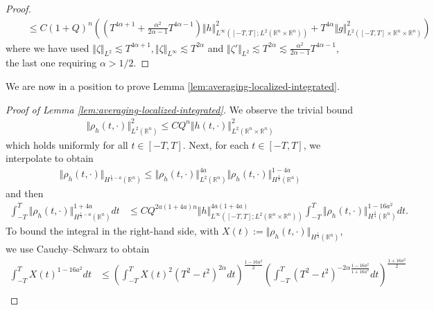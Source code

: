 \documentclass[11pt]{amsart}
\theoremstyle{definition}
\theoremstyle{remark}
\numberwithin{equation}{section}
\newcommand{\nrm}[1]{\Vert#1\Vert}
\newcommand{\0}{\emptyset}
\newcommand{\alp}{\alpha}
\newcommand{\zt}{\zeta}
\newcommand{\bbR}{\mathbb R}
\begin{document}
{\begin{proof}
\begin{equation*}
\begin{split}
				&\quad \leq C(1+Q)^{n}\left( ( T^{4\alp+1} + \frac{\alp^2}{2\alp-1} T^{4\alp - 1} ) \Vert   h\Vert^2_{L^\infty([-T, T]; L^{2}(\mathbb{R}^n\times\mathbb{R}^n))} + T^{4\alp} \Vert  g \Vert^2_{L^2([-T, T]\times\mathbb{R}^n\times\mathbb{R}^n)} \right) 
			\end{split}
		\end{equation*} where we have used $\nrm{\zt}_{L^2} \lesssim T^{4\alp+1}, \nrm{\zt}_{L^\infty} \lesssim T^{2\alp}$ and $\nrm{\zt'}_{L^2} \lesssim T^{2\alp} \lesssim \frac{\alp^2}{2\alp-1} T^{4\alp - 1} $, the last one requiring $\alp>1/2$. 
	\end{proof}
	
	We are now in a position to prove Lemma \ref{lem:averaging-localized-integrated}. 
	
	\begin{proof}[Proof of Lemma \ref{lem:averaging-localized-integrated}]
		We observe the trivial bound \begin{equation*}
			\begin{split}
				\nrm{\rho_{h}(t,\cdot)}^2_{L^2(\bbR^n)} \le CQ^{n} \nrm{h(t,\cdot)}_{L^2(\bbR^n\times\bbR^n)}^{2}
			\end{split}
		\end{equation*} which holds uniformly for all $t \in [-T,T]$. Next, for each $t \in [-T,T]$, we interpolate to obtain \begin{equation*}
		\begin{split}
			\nrm{\rho_{h}(t,\cdot)}_{H^{\frac14 - a }(\bbR^n)} \le \nrm{\rho_{h}(t,\cdot)}_{L^2(\bbR^n)}^{4a} \nrm{\rho_{h}(t,\cdot)}^{1-4a}_{H^{\frac14}(\bbR^n)}
		\end{split}
		\end{equation*} and then \begin{equation}\label{eq:inter}
		\begin{split}
			\int_{-T}^{T} \nrm{\rho_{h}(t,\cdot)}^{1+4a}_{H^{\frac14 - a }(\bbR^n)}  dt &\le CQ^{2a(1+4a) n} \nrm{h}_{L^{\infty}([-T,T];L^2(\bbR^n\times\bbR^n))}^{4a(1+4a)} \int_{-T}^{T}   \nrm{\rho_{h}(t,\cdot)}^{1-16a^2}_{H^{\frac14}(\bbR^n)} dt .
		\end{split}
		\end{equation} To bound the integral in the right-hand side, with $X(t):= \nrm{\rho_{h}(t,\cdot)}_{H^{\frac14}(\bbR^n)}$, we use Cauchy--Schwarz to obtain 
		\begin{equation*}
			\begin{split}
				\int_{-T}^{T} X(t)^{1-16a^2} dt & \leq \left( \int_{-T}^{T} X(t)^2 (T^2-t^2)^{2\alpha} dt \right)^{\frac{1-16a^2}{2}} \left( \int_{-T}^{T} (T^2-t^2)^{-2\alpha \frac{1-16a^2}{1+16a^2}} dt \right)^{\frac{1+16a^2}{2}} \\

\end{split}
\end{equation*}
\end{proof}}
\end{document}
